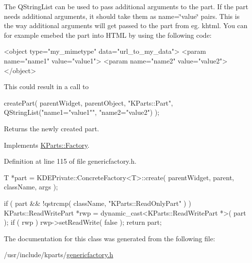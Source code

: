 \-The \-Q\-String\-List can be used to pass additional arguments to the part. \-If the part needs additional arguments, it should take them as name=\char`\"{}value\char`\"{} pairs. \-This is the way additional arguments will get passed to the part from eg. khtml. \-You can for example emebed the part into \-H\-T\-M\-L by using the following code\-: 
\begin{DoxyCode}
    <object type="my_mimetype" data="url_to_my_data">
        <param name="name1" value="value1">
        <param name="name2" value="value2">
    </object>
\end{DoxyCode}
 \-This could result in a call to 
\begin{DoxyCode}
     createPart( parentWidget, parentObject, "KParts::Part",
                 QStringList("name1="value1"", "name2="value2") );
\end{DoxyCode}


\begin{DoxyReturn}{\-Returns}
the newly created part. 
\end{DoxyReturn}


\-Implements \hyperlink{classKParts_1_1Factory_a05e336b747b65776e31db466736570f2}{\-K\-Parts\-::\-Factory}.



\-Definition at line 115 of file genericfactory.\-h.


\begin{DoxyCode}
        {
            T *part = KDEPrivate::ConcreteFactory<T>::create( parentWidget,
                                                              parent,
                                                              className,
                                                              args );

            if ( part && !qstrcmp( className, "KParts::ReadOnlyPart" ) )
            {
                KParts::ReadWritePart *rwp = dynamic_cast<KParts::ReadWritePart
       *>( part );
                if ( rwp )
                    rwp->setReadWrite( false );
            }
            return part;
        }
\end{DoxyCode}


\-The documentation for this class was generated from the following file\-:\begin{DoxyCompactItemize}
\item 
/usr/include/kparts/\hyperlink{genericfactory_8h}{genericfactory.\-h}\end{DoxyCompactItemize}
